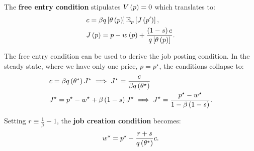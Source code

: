 \documentclass[11pt,leqno]{article}
\begin{document}
\begin{tcolorbox}[sharp corners,breakable, colback=gray!10, colframe=gray!90, title= Free entry condition]
    The \textbf{free entry condition} stipulates $V\left( p \right) = 0$
    which translates to:
    \begin{subequations}
        \begin{align}
            & c = \beta q\bs{\theta\bp{p}}  \E_p \bs{J\bp{p'}}, \\
            & J\bp{p} = p - w\bp{p} + \frac{\bp{1-s}c}{ q\bs{\theta\bp{p}}}.
        \end{align}
    \end{subequations}
\end{tcolorbox}
The free entry condition can be used to derive the job posting condition. 
In the steady state, where we have only one price, $p=p^{\star}$, the conditions collapse to:
\begin{subequations}
        \begin{align}
            & c = \beta q\left( \theta^{\star} \right)  J^{\star} \implies  J^{\star} = \frac{c}{\beta q\left( \theta^{\star} \right) }\\
            & J^{\star} = p^{\star} - w^{\star} + \beta \left( 1-s \right) J^{\star}  \implies J^{\star} = \frac{p^{\star} - w^{\star}}{1- \beta \left( 1-s \right)}.
        \end{align}
\end{subequations}
\begin{tcolorbox}[sharp corners,breakable, colback=gray!10, colframe=gray!90, title= Steady state job creation condition]
    Setting $r \equiv \frac{1}{\beta}-1$, the \textbf{job creation condition} becomes:
    \begin{equation}
        w^\star=p^\star - \frac{r+s}{q\left( \theta^\star \right)}c. \label{jobcreation}
    \end{equation}
\end{tcolorbox}
\end{document}
